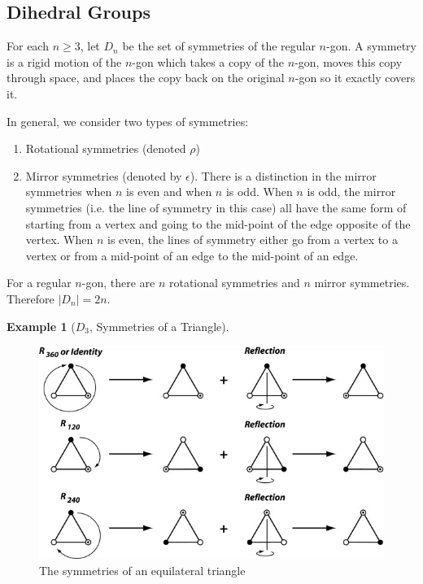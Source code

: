 \documentclass[12pt]{article}
\theoremstyle{definition}
\newcommand{\e}{\epsilon}
\newtheorem{example}{\color{WildStrawberry}Example}
\theoremstyle{definition}
\begin{document}
\subsection{Dihedral Groups}
For each $n \geq 3$, let $D_n$ be the set of symmetries of the regular $n$-gon. A symmetry is a rigid motion of the $n$-gon which takes a copy of the $n$-gon, moves this copy through space, and places the copy back on the original $n$-gon so it exactly covers it.  

In general, we consider two types of symmetries:
\begin{enumerate}
	\item Rotational symmetries (denoted $\rho$)
	\item Mirror symmetries (denoted by $\e$). There is a distinction in the mirror symmetries when $n$ is even and when $n$ is odd. When $n$ is odd, the mirror symmetries (i.e. the line of symmetry in this case) all have the same form of starting from a vertex and going to the mid-point of the edge opposite of the vertex. When $n$ is even, the lines of symmetry either go from a vertex to a vertex or from a mid-point of an edge to the mid-point of an edge. 
\end{enumerate}
For a regular $n$-gon, there are $n$ rotational symmetries and $n$ mirror symmetries. Therefore $|D_n| = 2n$.

\begin{example}[$D_3$, Symmetries of a Triangle]
\begin{figure}[H]
	\begin{center}
		\includegraphics[scale=3]{triangle_symmetries}
	\end{center}
	\caption{The symmetries of an equilateral triangle}
	\label{triangle_sym}
\end{figure}
\end{example}
\end{document}
